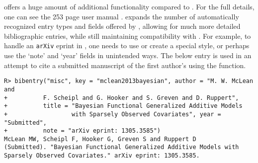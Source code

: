 \documentclass[article]{jss}\usepackage[]{graphicx}\usepackage[]{color}
\makeatletter
\newenvironment{kframe}{%
 \def\at@end@of@kframe{}%
 \ifinner\ifhmode%
  \def\at@end@of@kframe{\end{minipage}}%
  \begin{minipage}{\columnwidth}%
 \fi\fi%
 \def\FrameCommand##1{\hskip\@totalleftmargin \hskip-\fboxsep
 \colorbox{shadecolor}{##1}\hskip-\fboxsep
     \hskip-\linewidth \hskip-\@totalleftmargin \hskip\columnwidth}%
 \MakeFramed {\advance\hsize-\width
   \@totalleftmargin\z@ \linewidth\hsize
   \@setminipage}}%
 {\par\unskip\endMakeFramed%
 \at@end@of@kframe}
\newenvironment{knitrout}{}{} %
\makeatother
\begin{document}
\Biblatex{} offers a huge amount of additional functionality compared to \Bibtex{}.  For the full details, one can see the 253 page user manual \citep{biblatex}.  \Biblatex{} expands the number of automatically recognized entry types and fields offered by \Bibtex{}, allowing for much more detailed bibliographic entries,  while still maintaining compatibility with \Bibtex{}.  For example, to handle an \texttt{arXiv} eprint in \Bibtex{}, one needs to use or create a special \Bibtex{} style, or perhaps use the `note' and `year' fields in unintended ways.  The below entry is used in an attempt to cite a submitted manuscript of the first author's using the  function. 

\begin{knitrout}
\color{fgcolor}\begin{kframe}
\begin{verbatim}
R> bibentry("misc", key = "mclean2013bayesian", author = "M. W. McLean and 
+          F. Scheipl and G. Hooker and S. Greven and D. Ruppert",
+          title = "Bayesian Functional Generalized Additive Models 
+                  with Sparsely Observed Covariates", year = "Submitted", 
+          note = "arXiv eprint: 1305.3585")
McLean MW, Scheipl F, Hooker G, Greven S and Ruppert D
(Submitted). "Bayesian Functional Generalized Additive Models with
Sparsely Observed Covariates." arXiv eprint: 1305.3585.
\end{verbatim}
\end{kframe}
\end{knitrout}
\end{document}
